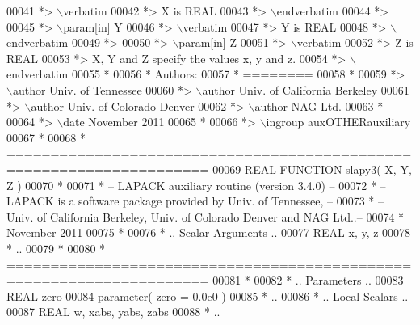 \begin{DoxyCode}
00041 \textcolor{comment}{*> \(\backslash\)verbatim}
00042 \textcolor{comment}{*>          X is REAL}
00043 \textcolor{comment}{*> \(\backslash\)endverbatim}
00044 \textcolor{comment}{*>}
00045 \textcolor{comment}{*> \(\backslash\)param[in] Y}
00046 \textcolor{comment}{*> \(\backslash\)verbatim}
00047 \textcolor{comment}{*>          Y is REAL}
00048 \textcolor{comment}{*> \(\backslash\)endverbatim}
00049 \textcolor{comment}{*>}
00050 \textcolor{comment}{*> \(\backslash\)param[in] Z}
00051 \textcolor{comment}{*> \(\backslash\)verbatim}
00052 \textcolor{comment}{*>          Z is REAL}
00053 \textcolor{comment}{*>          X, Y and Z specify the values x, y and z.}
00054 \textcolor{comment}{*> \(\backslash\)endverbatim}
00055 \textcolor{comment}{*}
00056 \textcolor{comment}{*  Authors:}
00057 \textcolor{comment}{*  ========}
00058 \textcolor{comment}{*}
00059 \textcolor{comment}{*> \(\backslash\)author Univ. of Tennessee }
00060 \textcolor{comment}{*> \(\backslash\)author Univ. of California Berkeley }
00061 \textcolor{comment}{*> \(\backslash\)author Univ. of Colorado Denver }
00062 \textcolor{comment}{*> \(\backslash\)author NAG Ltd. }
00063 \textcolor{comment}{*}
00064 \textcolor{comment}{*> \(\backslash\)date November 2011}
00065 \textcolor{comment}{*}
00066 \textcolor{comment}{*> \(\backslash\)ingroup auxOTHERauxiliary}
00067 \textcolor{comment}{*}
00068 \textcolor{comment}{*  =====================================================================}
00069 \textcolor{keyword}{      REAL             }\textcolor{keyword}{FUNCTION }slapy3( X, Y, Z )
00070 \textcolor{comment}{*}
00071 \textcolor{comment}{*  -- LAPACK auxiliary routine (version 3.4.0) --}
00072 \textcolor{comment}{*  -- LAPACK is a software package provided by Univ. of Tennessee,    --}
00073 \textcolor{comment}{*  -- Univ. of California Berkeley, Univ. of Colorado Denver and NAG Ltd..--}
00074 \textcolor{comment}{*     November 2011}
00075 \textcolor{comment}{*}
00076 \textcolor{comment}{*     .. Scalar Arguments ..}
00077       \textcolor{keywordtype}{REAL}               x, y, z
00078 \textcolor{comment}{*     ..}
00079 \textcolor{comment}{*}
00080 \textcolor{comment}{*  =====================================================================}
00081 \textcolor{comment}{*}
00082 \textcolor{comment}{*     .. Parameters ..}
00083       \textcolor{keywordtype}{REAL}               zero
00084       parameter( zero = 0.0e0 )
00085 \textcolor{comment}{*     ..}
00086 \textcolor{comment}{*     .. Local Scalars ..}
00087       \textcolor{keywordtype}{REAL}               w, xabs, yabs, zabs
00088 \textcolor{comment}{*     ..}

\end{DoxyCode}
